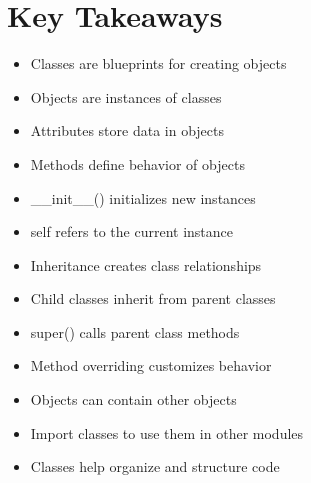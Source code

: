 \section*{Key Takeaways}
\begin{itemize}
    \item Classes are blueprints for creating objects
    \item Objects are instances of classes
    \item Attributes store data in objects
    \item Methods define behavior of objects
    \item \_\_init\_\_() initializes new instances
    \item self refers to the current instance
    \item Inheritance creates class relationships
    \item Child classes inherit from parent classes
    \item super() calls parent class methods
    \item Method overriding customizes behavior
    \item Objects can contain other objects
    \item Import classes to use them in other modules
    \item Classes help organize and structure code
\end{itemize} 